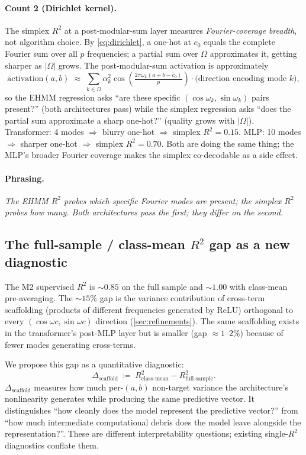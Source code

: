 \documentclass[11pt,a4paper]{article}
\begin{document}
\paragraph{Count 2 (Dirichlet kernel).} The simplex $R^2$ at a post-modular-sum layer measures \emph{Fourier-coverage breadth}, not algorithm choice. By \eqref{eq:dirichlet}, a one-hot at $c_0$ equals the complete Fourier sum over all $p$ frequencies; a partial sum over $\Omega$ approximates it, getting sharper as $|\Omega|$ grows. The post-modular-sum activation is approximately
\begin{equation}
    \mathrm{activation}(a, b) \;\approx\; \sum_{k \in \Omega} \alpha_k^2 \cos\!\left(\tfrac{2\pi\omega_k(a+b-c_0)}{p}\right) \cdot \text{(direction encoding mode } k\text{)},
\end{equation}
so the EHMM regression asks ``are these specific $(\cos\omega_k, \sin\omega_k)$ pairs present?'' (both architectures pass) while the simplex regression asks ``does the partial sum approximate a sharp one-hot?'' (quality grows with $|\Omega|$). Transformer: 4 modes $\Rightarrow$ blurry one-hot $\Rightarrow$ simplex $R^2 = 0.15$. MLP: 10 modes $\Rightarrow$ sharper one-hot $\Rightarrow$ simplex $R^2 = 0.70$. Both are doing the same thing; the MLP's broader Fourier coverage makes the simplex co-decodable as a side effect.

\paragraph{Phrasing.} \emph{The EHMM $R^2$ probes which specific Fourier modes are present; the simplex $R^2$ probes how many. Both architectures pass the first; they differ on the second.}

\subsection{The full-sample / class-mean $R^2$ gap as a new diagnostic}\label{sec:diagnostic}

The M2 supervised $R^2$ is ${\sim}0.85$ on the full sample and ${\sim}1.00$ with class-mean pre-averaging. The $\sim 15\%$ gap is the variance contribution of cross-term scaffolding (products of different frequencies generated by ReLU) orthogonal to every $(\cos\omega c, \sin\omega c)$ direction (\cref{sec:refinements}). The same scaffolding exists in the transformer's post-MLP layer but is smaller (gap $\approx 1$--$2\%$) because of fewer modes generating cross-terms.

We propose this gap as a quantitative diagnostic:
\begin{equation}
    \Delta_{\mathrm{scaffold}} \;\coloneqq\; R^2_{\mathrm{class\text{-}mean}} - R^2_{\mathrm{full\text{-}sample}}.
\end{equation}
$\Delta_{\mathrm{scaffold}}$ measures how much per-$(a,b)$ non-target variance the architecture's nonlinearity generates while producing the same predictive vector. It distinguishes ``how cleanly does the model represent the predictive vector?'' from ``how much intermediate computational debris does the model leave alongside the representation?''. These are different interpretability questions; existing single-$R^2$ diagnostics conflate them.
\end{document}
